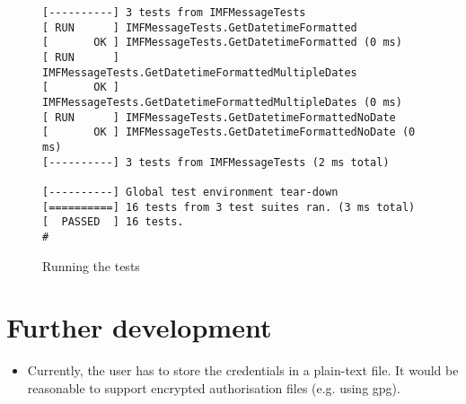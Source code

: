 \documentclass[a4]{report}
\begin{document}
\begin{figure}
\begin{verbatim}
[----------] 3 tests from IMFMessageTests
[ RUN      ] IMFMessageTests.GetDatetimeFormatted
[       OK ] IMFMessageTests.GetDatetimeFormatted (0 ms)
[ RUN      ] IMFMessageTests.GetDatetimeFormattedMultipleDates
[       OK ] IMFMessageTests.GetDatetimeFormattedMultipleDates (0 ms)
[ RUN      ] IMFMessageTests.GetDatetimeFormattedNoDate
[       OK ] IMFMessageTests.GetDatetimeFormattedNoDate (0 ms)
[----------] 3 tests from IMFMessageTests (2 ms total)

[----------] Global test environment tear-down
[==========] 16 tests from 3 test suites ran. (3 ms total)
[  PASSED  ] 16 tests.
#
\end{verbatim}
\caption{Running the tests}
\end{figure}


\chapter{Further development}

\begin{itemize}
  \item Currently, the user has to store the credentials in a plain-text file. It would be reasonable to support encrypted authorisation files (e.g. using gpg).
\end{itemize}

\printbibliography
\end{document}
